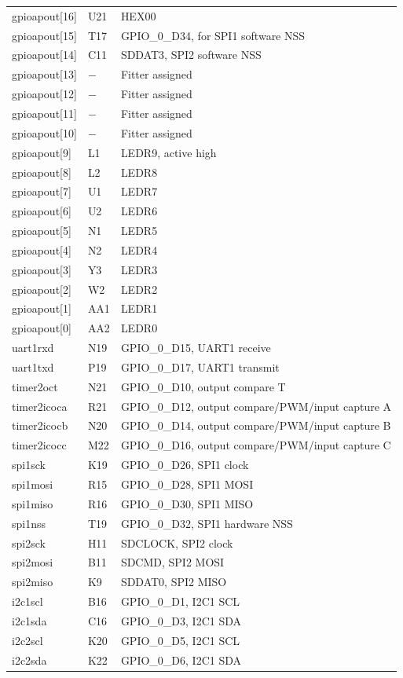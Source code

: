 \documentclass[12pt]{article}
\begin{document}
\begin{longtable}{lll}
gpioapout[16] & U21      & HEX00 \\
gpioapout[15] & T17      & GPIO\_0\_D34, for SPI1 software NSS \\
gpioapout[14] & C11      & SDDAT3, SPI2 software NSS \\
gpioapout[13] & $-$      & Fitter assigned \\
gpioapout[12] & $-$      & Fitter assigned \\
gpioapout[11] & $-$      & Fitter assigned \\
gpioapout[10] & $-$      & Fitter assigned \\
gpioapout[9]  & L1       & LEDR9, active high \\
gpioapout[8]  & L2       & LEDR8 \\
gpioapout[7]  & U1       & LEDR7 \\
gpioapout[6]  & U2       & LEDR6 \\
gpioapout[5]  & N1       & LEDR5 \\
gpioapout[4]  & N2       & LEDR4 \\
gpioapout[3]  & Y3       & LEDR3 \\
gpioapout[2]  & W2       & LEDR2 \\
gpioapout[1]  & AA1      & LEDR1 \\
gpioapout[0]  & AA2      & LEDR0 \\
uart1rxd      & N19      & GPIO\_0\_D15, UART1 receive \\
uart1txd      & P19      & GPIO\_0\_D17, UART1 transmit  \\
timer2oct     & N21      & GPIO\_0\_D10, output compare T \\
timer2icoca   & R21      & GPIO\_0\_D12, output compare/PWM/input capture A \\
timer2icocb   & N20      & GPIO\_0\_D14, output compare/PWM/input capture B \\
timer2icocc   & M22      & GPIO\_0\_D16, output compare/PWM/input capture C \\
spi1sck       & K19      & GPIO\_0\_D26, SPI1 clock \\
spi1mosi      & R15      & GPIO\_0\_D28, SPI1 MOSI \\
spi1miso      & R16      & GPIO\_0\_D30, SPI1 MISO \\
spi1nss       & T19      & GPIO\_0\_D32, SPI1 hardware NSS \\
spi2sck       & H11      & SDCLOCK, SPI2 clock \\
spi2mosi      & B11      & SDCMD, SPI2 MOSI \\
spi2miso      & K9       & SDDAT0, SPI2 MISO \\
i2c1scl       & B16      & GPIO\_0\_D1, I2C1 SCL \\
i2c1sda       & C16      & GPIO\_0\_D3, I2C1 SDA \\
i2c2scl       & K20      & GPIO\_0\_D5, I2C1 SCL \\
i2c2sda       & K22      & GPIO\_0\_D6, I2C1 SDA
\end{longtable}
\end{document}
